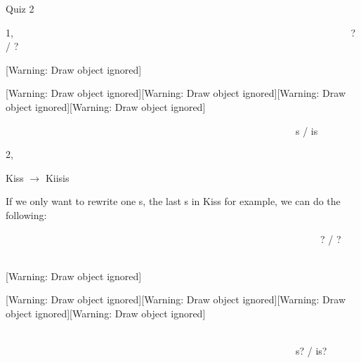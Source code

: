 \documentclass[letterpaper]{article}
\title{}
\author{}
\date{2018-11-20}
\begin{document}
Quiz 2


\bigskip

1,
\ \ \ \ \ \ \ \ \ \ \ \ \ \ \ \ \ \ \ \ \ \ \ \ \ \ \ \ \ \ \ \ \ \ \ \ \ \ \ \ \ \ \ \ \ \ \ \ \ \ \ \ \ \ \ \ \ \ \ \ \ \ \ \ \ \ \ \ ?
/ ?

[Warning: Draw object ignored]

[Warning: Draw object ignored][Warning: Draw object ignored][Warning: Draw object ignored][Warning: Draw object ignored]


\bigskip


\bigskip


\bigskip


\bigskip


\bigskip


\bigskip


\bigskip


\bigskip

\ \ \ \ \ \ \ \ \ \ \ \ \ \ \ \ \ \ \ \ \ \ \ \ \ \ \ \ \ \ \ \ \ \ \ \ \ \ \ \ \ \ \ \ \ \ \ \ \ \ \ \ \ \ \ \ \ \ \ s
/ is


\bigskip

2,

Kiss $\rightarrow $ Kiisis


\bigskip

If we only want to rewrite one s, the last s in Kiss for example, we can do the following:


\bigskip

\ \ \ \ \ \ \ \ \ \ \ \ \ \ \ \ \ \ \ \ \ \ \ \ \ \ \ \ \ \ \ \ \ \ \ \ \ \ \ \ \ \ \ \ \ \ \ \ \ \ \ \ \ \ \ \ \ \ \ \ \ \ \ \ ?
/ ? \ \ \ \ \ \ \ \ \ \ \ \ 

[Warning: Draw object ignored] \ \ \ \ \ \ \ \ \ \ \ \ \ \ \ \ \ \ \ \ \ \ 


\bigskip

[Warning: Draw object ignored][Warning: Draw object ignored][Warning: Draw object ignored][Warning: Draw object ignored]
\ \ \ \ \ \ \ \ \ \ \ \ \ \ \ \ \ \ \ \ \ \ \ \ \ \ \ \ \ \ \ \ \ \ \ \ \ \ \ \ \ \ \ \ \ \ \ \ \ \ \ \ \ \ \ \ \ \ \ \ 


\bigskip


\bigskip


\bigskip


\bigskip


\bigskip


\bigskip


\bigskip


\bigskip

\ \ \ \ \ \ \ \ \ \ \ \ \ \ \ \ \ \ \ \ \ \ \ \ \ \ \ \ \ \ \ \ \ \ \ \ \ \ \ \ \ \ \ \ \ \ \ \ \ \ \ \ \ \ \ \ \ \ \ s?
/ is?
\end{document}
